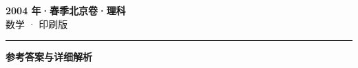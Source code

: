 \documentclass[zihao=5, a4paper]{ctexart}
\begin{document}
\begin{center}
  {\Large\bfseries 2004 年·春季北京卷·理科}\\[4pt]
  {\large 数学 · 印刷版}
\end{center}
\medskip
{}

\par\bigskip\hrule\bigskip
{}
\begin{center}{\large\bfseries 参考答案与详细解析}\end{center}
\smallskip

\end{document}
